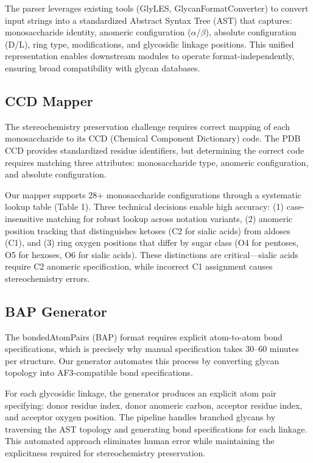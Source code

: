 \documentclass[11pt,a4paper]{article}
\begin{document}
The parser leverages existing tools (GlyLES, GlycanFormatConverter) to convert input strings into a standardized Abstract Syntax Tree (AST) that captures: monosaccharide identity, anomeric configuration ($\alpha$/$\beta$), absolute configuration (D/L), ring type, modifications, and glycosidic linkage positions. This unified representation enables downstream modules to operate format-independently, ensuring broad compatibility with glycan databases.

\subsection{CCD Mapper}
\label{sec:ccd}

The stereochemistry preservation challenge requires correct mapping of each monosaccharide to its CCD (Chemical Component Dictionary) code. The PDB CCD provides standardized residue identifiers, but determining the correct code requires matching three attributes: monosaccharide type, anomeric configuration, and absolute configuration.

Our mapper supports 28+ monosaccharide configurations through a systematic lookup table (Table 1). Three technical decisions enable high accuracy: (1) case-insensitive matching for robust lookup across notation variants, (2) anomeric position tracking that distinguishes ketoses (C2 for sialic acids) from aldoses (C1), and (3) ring oxygen positions that differ by sugar class (O4 for pentoses, O5 for hexoses, O6 for sialic acids). These distinctions are critical---sialic acids require C2 anomeric specification, while incorrect C1 assignment causes stereochemistry errors.

\subsection{BAP Generator}
\label{sec:bap}

The bondedAtomPairs (BAP) format requires explicit atom-to-atom bond specifications, which is precisely why manual specification takes 30--60 minutes per structure. Our generator automates this process by converting glycan topology into AF3-compatible bond specifications.

For each glycosidic linkage, the generator produces an explicit atom pair specifying: donor residue index, donor anomeric carbon, acceptor residue index, and acceptor oxygen position. The pipeline handles branched glycans by traversing the AST topology and generating bond specifications for each linkage. This automated approach eliminates human error while maintaining the explicitness required for stereochemistry preservation.
\end{document}

